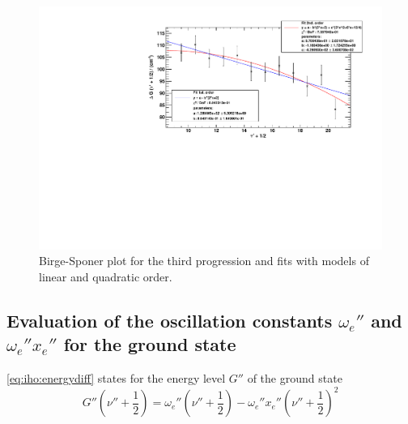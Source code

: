 \begin{figure}[H]
\begin{center}
  \includegraphics[width=\textwidth]{../img/prog3_birgesponer.pdf}
  \caption[---]{Birge-Sponer plot for the third progression and fits with models of linear and quadratic order.}
  \label{img:prog3}
\end{center}
\end{figure}


\subsection{Evaluation of the oscillation constants $\omega_e''$ and $\omega_e'' x_e''$ for the ground state}

\autoref{eq:iho:energydiff} states for the energy level $G''$ of the ground state
\begin{equation}
  G'' \left( \nu''+\frac{1}{2} \right) = \omega_e'' \left( \nu'' + \frac{1}{2} \right) - \omega_e'' x_e'' \left( \nu'' + \frac{1}{2} \right)^2 
\end{equation}


